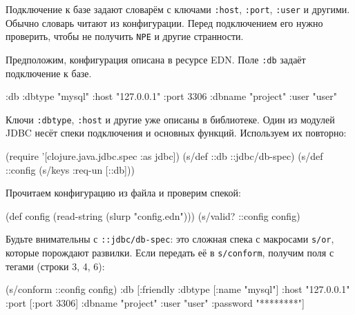 Подключение к базе задают словарём с ключами \verb|:host|, \verb|:port|,
\verb|:user| и другими. Обычно словарь читают из конфигурации. Перед
подключением его нужно проверить, чтобы не получить \verb|NPE| и другие
странности.


Предположим, конфигурация описана в ресурсе EDN. Поле \verb|:db| задаёт
подключение к базе.


\begin{english}
  \begin{clojure}
{:db {:dbtype "mysql"
      :host "127.0.0.1"
      :port 3306
      :dbname "project"
      :user "user"}}
  \end{clojure}
\end{english}

Ключи \verb|:dbtype|, \verb|:host| и другие уже описаны в библиотеке. Один
из модулей JDBC несёт спеки подключения и основных функций. Используем их
повторно:

\begin{english}
  \begin{clojure}
(require '[clojure.java.jdbc.spec :as jdbc])
(s/def ::db ::jdbc/db-spec)
(s/def ::config (s/keys :req-un [::db]))
  \end{clojure}
\end{english}

\noindent
Прочитаем конфигурацию из файла и проверим спекой:

\begin{english}
  \begin{clojure}
(def config (read-string (slurp "config.edn")))
(s/valid? ::config config)
  \end{clojure}
\end{english}

\label{jdbc-conform-warning}


Будьте внимательны с \verb|::jdbc/db-spec|: это сложная спека с макросами
\verb|s/or|, которые порождают развилки. Если передать её в
\verb|s/conform|, получим поля с тегами (строки 3, 4, 6):

\begin{english}
  \begin{clojure/lines}
(s/conform ::config config)
{:db
 [:friendly
  {:dbtype   [:name "mysql"]
   :host     "127.0.0.1"
   :port     [:port 3306]
   :dbname   "project"
   :user     "user"
   :password "********"}]}
  \end{clojure/lines}
\end{english}

